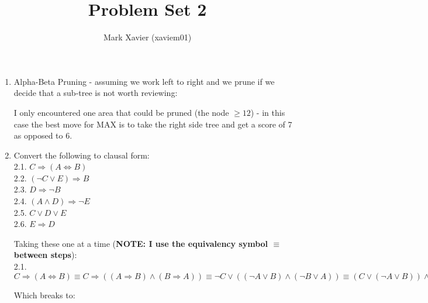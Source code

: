 \documentclass{article}
\title{Problem Set 2}
\author{Mark Xavier (xaviem01)}
\begin{document}
	
	\maketitle
	
	\begin{enumerate}
		\item Alpha-Beta Pruning - assuming we work left to right and we prune if we decide that a sub-tree is not worth reviewing:
		
		\begin{center}
		\end{center}
	
		I only encountered one area that could be pruned (the node $\geq 12$) - in this case the best move for MAX is to take the right side tree and get a score of 7 as opposed to 6.\\
		
		\item Convert the following to clausal form:\\
		2.1. $C \Rightarrow (A \Leftrightarrow B)$\\
		2.2. $(\neg C \vee E) \Rightarrow B$\\
		2.3. $D \Rightarrow \neg B$\\
		2.4. $(A \wedge D) \Rightarrow \neg E$\\
		2.5. $C \vee D \vee E$\\
		2.6. $E \Rightarrow D$
		
		Taking these one at a time (\textbf{NOTE: I use the equivalency symbol $\equiv$ between steps}):\\
		
		2.1. $C \Rightarrow (A \Leftrightarrow B) \equiv C \Rightarrow ((A \Rightarrow B) \wedge (B \Rightarrow A)) \equiv \neg C \vee ((\neg A \vee B) \wedge (\neg B \vee A)) \equiv (C \vee (\neg A \vee B)) \wedge (C \vee (\neg B \vee A))$
		
		Which breaks to:
		

\end{enumerate}
\end{document}
